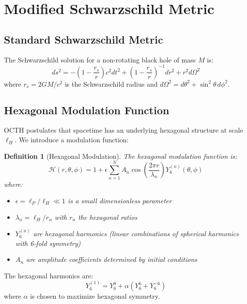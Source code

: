 \documentclass[12pt,a4paper]{article}
\newtheorem{definition}{Definition}
\begin{document}
\section{Modified Schwarzschild Metric}

\subsection{Standard Schwarzschild Metric}

The Schwarzschild solution for a non-rotating black hole of mass $M$ is:
\begin{equation}
    ds^2 = -\left(1 - \frac{r_s}{r}\right)c^2 dt^2 + \left(1 - \frac{r_s}{r}\right)^{-1}dr^2 + r^2 d\Omega^2
\end{equation}
where $r_s = 2GM/c^2$ is the Schwarzschild radius and $d\Omega^2 = d\theta^2 + \sin^2\theta\, d\phi^2$.

\subsection{Hexagonal Modulation Function}

OCTH postulates that spacetime has an underlying hexagonal structure at scale $\ell_H$. We introduce a modulation function:

\begin{definition}[Hexagonal Modulation]
The hexagonal modulation function is:
\begin{equation}
    \mathcal{H}(r, \theta, \phi) = 1 + \epsilon \sum_{n=1}^{N} A_n \cos\left(\frac{2\pi r}{\lambda_n}\right) Y_6^{(n)}(\theta, \phi)
\end{equation}
where:
\begin{itemize}
    \item $\epsilon = \ell_P / \ell_H \ll 1$ is a small dimensionless parameter
    \item $\lambda_n = \ell_H / r_n$ with $r_n$ the hexagonal ratios
    \item $Y_6^{(n)}$ are hexagonal harmonics (linear combinations of spherical harmonics with 6-fold symmetry)
    \item $A_n$ are amplitude coefficients determined by initial conditions
\end{itemize}
\end{definition}

The hexagonal harmonics are:
\begin{equation}
    Y_6^{(1)} = Y_6^0 + \alpha\left(Y_6^6 + Y_6^{-6}\right)
\end{equation}
where $\alpha$ is chosen to maximize hexagonal symmetry.
\end{document}
